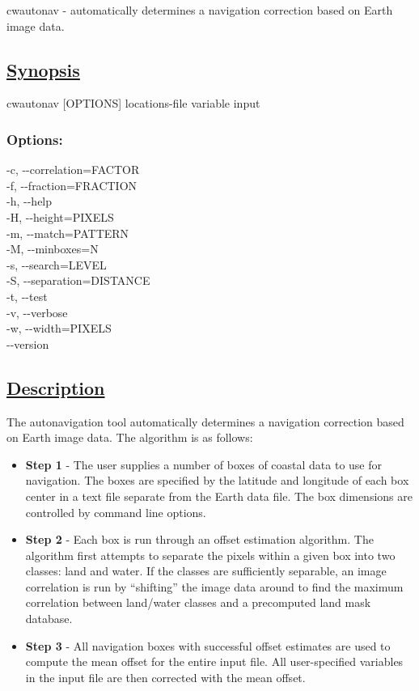    cwautonav - automatically determines a navigation correction based on Earth image data.  
\subsection*{\underline{Synopsis}}


 cwautonav [OPTIONS] locations-file variable input
\subsubsection*{Options:}


  -c, -{-}correlation=FACTOR \\ 
 -f, -{-}fraction=FRACTION \\ 
 -h, -{-}help \\ 
 -H, -{-}height=PIXELS \\ 
 -m, -{-}match=PATTERN \\ 
 -M, -{-}minboxes=N \\ 
 -s, -{-}search=LEVEL \\ 
 -S, -{-}separation=DISTANCE \\ 
 -t, -{-}test \\ 
 -v, -{-}verbose \\ 
 -w, -{-}width=PIXELS \\ 
 -{-}version \\ 

\subsection*{\underline{Description}}


 The autonavigation tool automatically determines a navigation correction based on Earth image data. The algorithm is as follows: \begin{itemize}
\item \textbf{Step 1}
 - The user supplies a number of boxes of coastal data to use for navigation. The boxes are specified by the latitude and longitude of each box center in a text file separate from the Earth data file. The box dimensions are controlled by command line options.
\item \textbf{Step 2}
 - Each box is run through an offset estimation algorithm. The algorithm first attempts to separate the pixels within a given box into two classes: land and water. If the classes are sufficiently separable, an image correlation is run by ``shifting'' the image data around to find the maximum correlation between land/water classes and a precomputed land mask database.
\item \textbf{Step 3}
 - All navigation boxes with successful offset estimates are used to compute the mean offset for the entire input file. All user-specified variables in the input file are then corrected with the mean offset.

\end{itemize}



